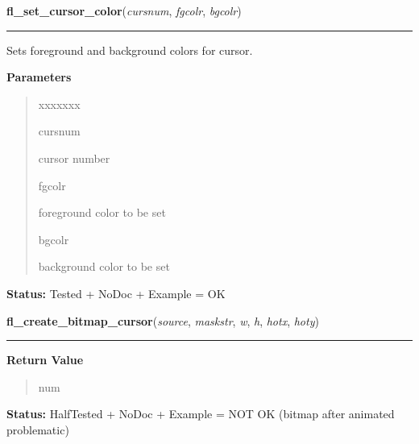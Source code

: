 \hspace{.8\funcindent}\begin{boxedminipage}{\funcwidth}

    \raggedright \textbf{fl\_set\_cursor\_color}(\textit{cursnum}, \textit{fgcolr}, \textit{bgcolr})

    \vspace{-1.5ex}

    \rule{\textwidth}{0.5\fboxrule}
\setlength{\parskip}{2ex}
    Sets foreground and background colors for cursor.

\setlength{\parskip}{1ex}
      \textbf{Parameters}
      \vspace{-1ex}

      \begin{quote}
        \begin{Ventry}{xxxxxxx}

          \item[cursnum]

          cursor number

          \item[fgcolr]

          foreground color to be set

          \item[bgcolr]

          background color to be set

        \end{Ventry}

      \end{quote}

\textbf{Status:} Tested + NoDoc + Example = OK



    \end{boxedminipage}

    \label{xformslib:library:fl_create_bitmap_cursor}

    \vspace{0.5ex}

\hspace{.8\funcindent}\begin{boxedminipage}{\funcwidth}

    \raggedright \textbf{fl\_create\_bitmap\_cursor}(\textit{source}, \textit{maskstr}, \textit{w}, \textit{h}, \textit{hotx}, \textit{hoty})

    \vspace{-1.5ex}

    \rule{\textwidth}{0.5\fboxrule}
\setlength{\parskip}{2ex}
\setlength{\parskip}{1ex}
      \textbf{Return Value}
    \vspace{-1ex}

      \begin{quote}
      num

      \end{quote}

\textbf{Status:} HalfTested + NoDoc + Example = NOT OK (bitmap after animated problematic)



    \end{boxedminipage}


